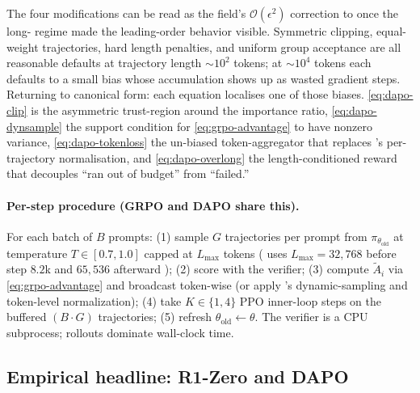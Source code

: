 \begin{analogy}
The four  modifications can be read as the field's
$\mathcal{O}(\epsilon^2)$ correction to  once the long- regime
made the leading-order behavior visible. Symmetric clipping, equal-weight
trajectories, hard length penalties, and uniform group acceptance are
all reasonable defaults at trajectory length $\sim\!10^2$ tokens; at
$\sim\!10^4$ tokens each defaults to a small bias whose accumulation
shows up as wasted gradient steps. Returning to canonical form: each
 equation localises one of those biases.
\cref{eq:dapo-clip} is the asymmetric trust-region around the importance
ratio, \cref{eq:dapo-dynsample} the support condition for
\cref{eq:grpo-advantage} to have nonzero variance,
\cref{eq:dapo-tokenloss} the un-biased token-aggregator that replaces
's per-trajectory normalisation, and \cref{eq:dapo-overlong} the
length-conditioned reward that decouples ``ran out of budget'' from
``failed.''
\end{analogy}

\paragraph{Per-step procedure (GRPO and DAPO share this).} For each
batch of $B$ prompts: (1) sample $G$ trajectories per prompt from
$\pi_{\theta_\mathrm{old}}$ at temperature $T \in [0.7, 1.0]$ capped at
$L_\mathrm{max}$ tokens ( uses $L_\mathrm{max} = 32{,}768$
before step $8.2$k and $65{,}536$ afterward \citep[\S
2.1]{deepseek-r1}); (2) score with the verifier; (3) compute
$\tilde{A}_i$ via \cref{eq:grpo-advantage} and broadcast token-wise (or
apply 's dynamic-sampling and token-level normalization); (4) take
$K \in \{1, 4\}$ PPO inner-loop steps on the buffered $(B \cdot G)$
trajectories; (5) refresh
$\theta_\mathrm{old} \leftarrow \theta$. The verifier is a CPU
subprocess; rollouts dominate wall-clock time.

\subsection{Empirical headline: R1-Zero and DAPO}
\label{sec:rlvr-empirics}

